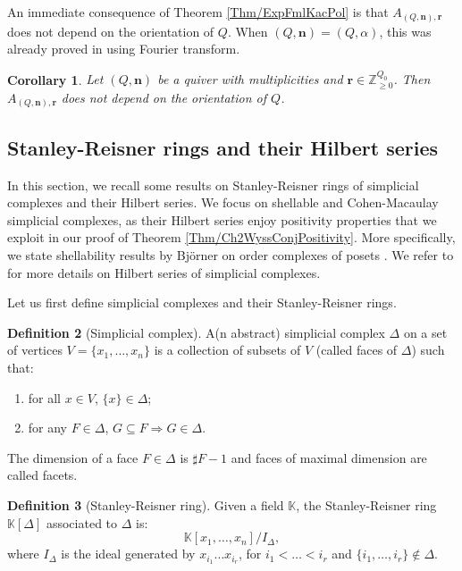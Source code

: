 \documentclass[11pt,english]{article}
\numberwithin{equation}{section}
\numberwithin{figure}{section}
\theoremstyle{definition}
\newtheorem{df}{Definition}[subsection]
\theoremstyle{plain}
\newtheorem{cor}[df]{Corollary}
\theoremstyle{remark}
\newcommand\nn{\mathbf{n}}
\newcommand\rr{\mathbf{r}}
\newcommand\ZZ{\mathbb{Z}}
\newcommand\KK{\mathbb{K}}
\begin{document}
An immediate consequence of Theorem \ref{Thm/ExpFmlKacPol} is that
$A_{(Q,\nn),\rr}$ does not depend on the orientation of $Q$. When
$(Q,\nn)=(Q,\alpha)$, this was already proved in \cite[Thm. 1.1.]{HLRV24}
using Fourier transform.

\begin{cor}

Let $(Q,\nn)$ be a quiver with multiplicities and $\rr\in\ZZ_{\geq0}^{Q_{0}}$.
Then $A_{(Q,\nn),\rr}$ does not depend on the orientation of $Q$.

\end{cor}

\subsection{Stanley-Reisner rings and their Hilbert series \label{Subsect/SRrings}}

In this section, we recall some results on Stanley-Reisner rings of
simplicial complexes and their Hilbert series. We focus on shellable
and Cohen-Macaulay simplicial complexes, as their Hilbert series enjoy
positivity properties that we exploit in our proof of Theorem \ref{Thm/Ch2WyssConjPositivity}.
More specifically, we state shellability results by Björner on order
complexes of posets \cite{Bjo80}. We refer to \cite{Sta07} for more
details on Hilbert series of simplicial complexes.

Let us first define simplicial complexes and their Stanley-Reisner
rings.

\begin{df}[Simplicial complex]

A(n abstract) simplicial complex $\Delta$ on a set of vertices $V=\{x_{1},\ldots,x_{n}\}$
is a collection of subsets of $V$ (called faces of $\Delta$) such
that: 
\begin{enumerate}
\item for all $x\in V$, $\{x\}\in\Delta$;
\item for any $F\in\Delta$, $G\subseteq F\Rightarrow G\in\Delta$.
\end{enumerate}
The dimension of a face $F\in\Delta$ is $\sharp F-1$ and faces of
maximal dimension are called facets.

\end{df}

\begin{df}[Stanley-Reisner ring]

Given a field $\KK$, the Stanley-Reisner ring $\KK[\Delta]$ associated
to $\Delta$ is:\[
\KK[x_1,\ldots,x_n]/I_{\Delta},
\] where $I_{\Delta}$ is the ideal generated by $x_{i_{1}}\ldots x_{i_{r}}$,
for $i_{1}<\ldots<i_{r}$ and $\{i_{1},\ldots,i_{r}\}\notin\Delta$.

\end{df}
\end{document}
